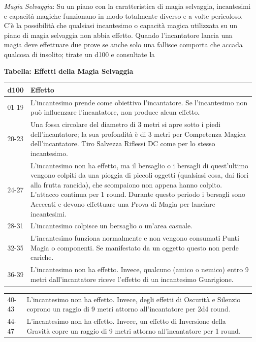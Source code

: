 \documentclass[a4paper,twoside,openany]{book}
\begin{document}
\begin{multicols}{2}
\emph{Magia Selvaggia}: Su un piano con la caratteristica di magia selvaggia, incantesimi e capacità magiche funzionano in modo totalmente diverso e a volte pericoloso. C'è la possibilità che qualsiasi incantesimo o capacità magica utilizzata su un piano di magia selvaggia non abbia effetto. Quando l'incantatore lancia una magia deve effettuare due prove se anche solo una fallisce comporta che accada qualcosa di insolito; tirate un d100 e consultate la

\medskip

\textbf{Tabella: Effetti della Magia Selvaggia}

\medskip

\noindent\begin{tabularx}{0.5\textwidth}{lX}
	d100&Effetto\\
	\toprule
	01-19&L'incantesimo prende come obiettivo l'incantatore. Se l'incantesimo non può influenzare l'incantatore, non produce alcun effetto.\\
	20-23&Una fossa circolare del diametro di 3 metri si apre sotto i piedi dell'incantatore; la sua profondità è di 3 metri per Competenza Magica dell'incantatore. Tiro Salvezza Riflessi DC come per lo stesso incantesimo.\\
	24-27&L'incantesimo non ha effetto, ma il bersaglio o i bersagli di quest'ultimo vengono colpiti da una pioggia di piccoli oggetti (qualsiasi cosa, dai fiori alla frutta rancida), che scompaiono non appena hanno colpito. L'attacco continua per 1 round. Durante questo periodo i bersagli sono Accecati e devono effettuare una Prova di Magia per lanciare incantesimi.\\
	28-31&L'incantesimo colpisce un bersaglio o un'area casuale.\\
	32-35&L'incantesimo funziona normalmente e non vengono consumati Punti Magia o componenti. Se manifestato da un oggetto questo non perde cariche.\\
	36-39&L'incantesimo non ha effetto. Invece, qualcuno (amico o nemico) entro 9 metri dall'incantatore riceve l'effetto di un incantesimo Guarigione.
\end{tabularx}
\noindent\begin{tabularx}{0.5\textwidth}{lX}
	40-43&L'incantesimo non ha effetto. Invece, degli effetti di Oscurità e Silenzio coprono un raggio di 9 metri attorno all'incantatore per 2d4 round.\\
	44-47&L'incantesimo non ha effetto. Invece, un effetto di Inversione della Gravità copre un raggio di 9 metri attorno all'incantatore per 1 round.\\

\end{tabularx}
\end{multicols}
\end{document}
